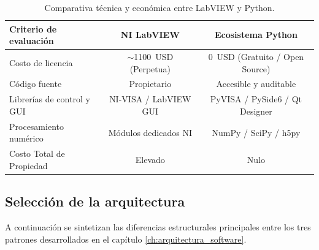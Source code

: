 \vspace{3\baselineskip}
\begin{table}[H]
    \centering
    \begin{small}
        \caption{Comparativa técnica y económica entre LabVIEW y Python.}
        \label{tab:comparativa_software_costos}
        \begin{tabular}{lcc}
            \toprule
            \textbf{Criterio de evaluación} & \textbf{NI LabVIEW}              & \textbf{Ecosistema Python}            \\ \midrule
            Costo de licencia               & $\sim$\qty{1100}{USD} (Perpetua) & \qty{0}{USD} (Gratuito / Open Source) \\ \midrule
            Código fuente                   & Propietario                      & Accesible y auditable                 \\ \midrule
            Librerías de control y GUI      & NI-VISA / LabVIEW GUI            & PyVISA / PySide6 / Qt Designer        \\ \midrule
            Procesamiento numérico          & Módulos dedicados NI             & NumPy / SciPy / h5py                  \\ \midrule
            Costo Total de Propiedad        & Elevado                          & Nulo                                  \\ \bottomrule
        \end{tabular}
    \end{small}
\end{table}
\vspace{3\baselineskip}

\subsection{Selección de la arquitectura}

A continuación se sintetizan las diferencias estructurales principales entre los tres patrones desarrollados en el capítulo \ref{ch:arquitectura_software}.

